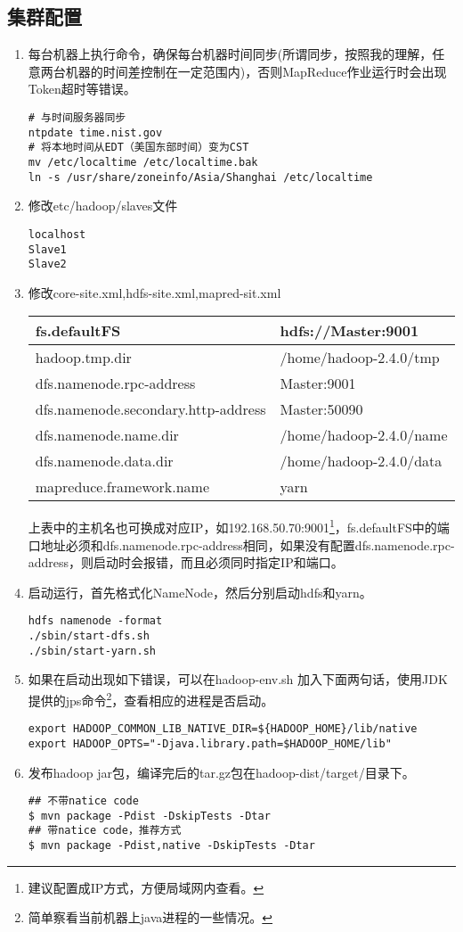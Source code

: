 \subsection{集群配置}
\begin{enumerate}[(1)]
\item 每台机器上执行命令，确保每台机器时间同步(所谓同步，按照我的理解，任意两台机器的时间差控制在一定范围内)，否则MapReduce作业运行时会出现Token超时等错误。
\begin{verbatim}
# 与时间服务器同步
ntpdate time.nist.gov
# 将本地时间从EDT（美国东部时间）变为CST
mv /etc/localtime /etc/localtime.bak
ln -s /usr/share/zoneinfo/Asia/Shanghai /etc/localtime
\end{verbatim}
\item 修改etc/hadoop/slaves文件
\begin{verbatim}
localhost
Slave1
Slave2
\end{verbatim}
\item 修改core-site.xml,hdfs-site.xml,mapred-sit.xml
\begin{table}[h]
  \centering
  \begin{tabular}{|l|l|}
\hline
fs.defaultFS &hdfs://Master:9001 \\ \hline
hadoop.tmp.dir & /home/hadoop-2.4.0/tmp \\ \hline
dfs.namenode.rpc-address & Master:9001\\ \hline
dfs.namenode.secondary.http-address& Master:50090 \\ \hline
dfs.namenode.name.dir   & /home/hadoop-2.4.0/name\\ \hline
dfs.namenode.data.dir   &   /home/hadoop-2.4.0/data\\ \hline
mapreduce.framework.name &  yarn \\ \hline
  \end{tabular}
\end{table}
\par 上表中的主机名也可换成对应IP，如192.168.50.70:9001\footnote{建议配置成IP方式，方便局域网内查看。}，fs.defaultFS中的端口地址必须和dfs.namenode.rpc-address相同，如果没有配置dfs.namenode.rpc-address，则启动时会报错，而且必须同时指定IP和端口。
\item 启动运行，首先格式化NameNode，然后分别启动hdfs和yarn。
\begin{verbatim}
hdfs namenode -format
./sbin/start-dfs.sh
./sbin/start-yarn.sh
\end{verbatim}
\item 如果在启动出现如下错误，可以在hadoop-env.sh 加入下面两句话，使用JDK提供的jps命令\footnote{简单察看当前机器上java进程的一些情况。}，查看相应的进程是否启动。
\begin{verbatim}
export HADOOP_COMMON_LIB_NATIVE_DIR=${HADOOP_HOME}/lib/native
export HADOOP_OPTS="-Djava.library.path=$HADOOP_HOME/lib"
\end{verbatim}
\item 发布hadoop jar包，编译完后的tar.gz包在hadoop-dist/target/目录下。
\begin{verbatim}
## 不带natice code
$ mvn package -Pdist -DskipTests -Dtar
## 带natice code，推荐方式
$ mvn package -Pdist,native -DskipTests -Dtar
\end{verbatim}
\end{enumerate}
